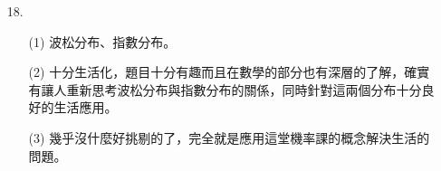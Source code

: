 \documentclass{article}
\begin{document}
\begin{enumerate}
    \item [18.]
    \begin{enumerate}
        \item [(1)] 波松分布、指數分布。
        \item [(2)] 十分生活化，題目十分有趣而且在數學的部分也有深層的了解，確實有讓人重新思考波松分布與指數分布的關係，同時針對這兩個分布十分良好的生活應用。
        \item [(3)] 幾乎沒什麼好挑剔的了，完全就是應用這堂機率課的概念解決生活的問題。        
    \end{enumerate}

\end{enumerate}
\end{document}
